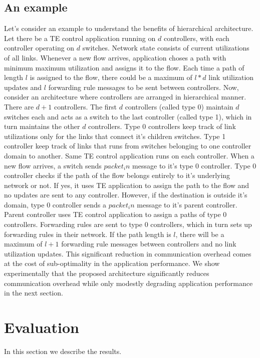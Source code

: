 \documentclass[10pt, twocolumn]{article}
\begin{document}
\subsection{An example}
\label{example}
Let's consider an example to understand the benefits of hierarchical architecture. Let there be a TE control application running on $d$ controllers, with each controller operating on $d$ switches. Network state consists of current utilizations of all links. Whenever a new flow arrives, application choses a path with minimum maximum utilization and assigns it to the flow. Each time a path of length $l$ is assigned to the flow, there could be a maximum of $l*d$ link utilization updates and $l$ forwarding rule messages to be sent between controllers. Now, consider an architecture where controllers are arranged in hierarchical manner. There are $d+1$ controllers. The first $d$ controllers (called type 0) maintain $d$ switches each and acts as a switch to the last controller (called type 1), which in turn maintains the other $d$ controllers. Type 0 controllers keep track of link utilizations only for the links that connect it's children switches. Type 1 controller keep track of links that runs from switches belonging to one controller domain to another. Same TE control application runs on each controller. When a new flow arrives, a switch sends $packet_in$ message to it's type 0 controller. Type 0 controller checks if the path of the flow belongs entirely to it's underlying network or not. If yes, it uses TE application to assign the path to the flow and no updates are sent to any controller. However, if the destination is outside it's domain, type 0 controller sends a $packet_in$ message to it's parent controller. Parent controller uses TE control application to assign a paths of type 0 controllers. Forwarding rules are sent to type 0 controllers, which in turn sets up forwarding rules in their network. If the path length is $l$, there will be a maximum of $l+1$ forwarding rule messages between controllers and no link utilization updates. This significant reduction in communication overhead comes at the cost of sub-optimality in the application performance. We show experimentally that the proposed architecture significantly reduces communication overhead while only modestly degrading application performance in the next section.

\section{Evaluation}
\label{sec:eval}
In this section we describe the results.
\end{document}
